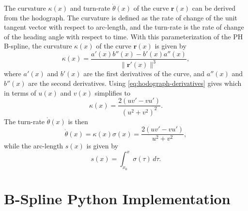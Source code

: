The curvature $\kappa(x)$ and turn-rate $\dot\theta(x)$ of the curve $\mathbf r(x)$ can be derived from the hodograph. The curvature is defined as the rate of change of the unit tangent vector with respect to arc-length, and the turn-rate is the rate of change of the heading angle with respect to time.
With this parameterization of the PH B-spline, the curvature $\kappa(x)$ of the curve $\mathbf r(x)$ is given by
\begin{equation}
    \kappa(x) = \frac{a'(x)b''(x) - b'(x)a''(x)}{\|\mathbf r'(x)\|^3},
\end{equation}
where $a'(x)$ and $b'(x)$ are the first derivatives of the curve, and $a''(x)$ and $b''(x)$ are the second derivatives. Using \cref{eq:hodograph-derivatives} gives
which in terms of $u(x)$ and $v(x)$ simplifies to
\begin{equation}\label{eq:curvature}
    \kappa(x) = \frac{2(uv'-vu')}{(u^2+v^2)^2}.
\end{equation}
The turn-rate $\dot\theta(x)$ is then
\begin{equation}\label{eq:turn-rate}
    \dot\theta(x) = \kappa(x) \sigma(x) = \frac{2(uv'-vu')}{u^2+v^2},
\end{equation}
while the arc-length $s(x)$ is given by
\begin{equation}
    s(x) = \int_{x_0}^{x}\sigma(\tau)\,d\tau.
\end{equation}



\chapter{B-Spline Python Implementation}\label{app:b-spline-python-implementation}


